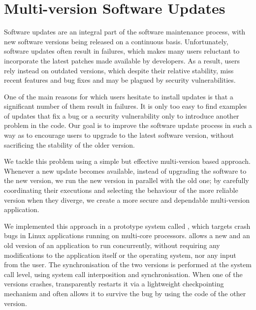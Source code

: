 \chapter{Multi-version Software Updates}
\label{chap:safe-updates}

Software updates are an integral part of the software maintenance
process, with new software versions being released on a continuous
basis.  Unfortunately, software updates often result in failures,
which makes many users reluctant to incorporate the latest patches
made available by developers.  As a result, users rely instead on
outdated versions, which despite their relative stability, miss recent
features and bug fixes and may be plagued by security vulnerabilities.

One of the main reasons for which users hesitate to install updates is
that a significant number of them result in failures.  It is only too
easy to find examples of updates that fix a bug or a security
vulnerability only to introduce another problem in 
the code. Our goal is to improve the software update
process in such a way as to encourage users to upgrade to the latest
software version, without sacrificing the stability of the older
version.

We tackle this problem using a simple but effective multi-version
based approach.  Whenever a new update becomes available, instead of
upgrading the software to the new version, we run the new version in
parallel with the old one; by carefully coordinating their executions
and selecting the behaviour of the more reliable version when they
diverge, we create a more secure and dependable multi-version
application.

We implemented this approach in a prototype system called \mx, which
targets crash bugs in Linux applications running on multi-core
processors. \mx allows a new and an old version of an application to
run concurrently, without requiring any
modifications to the application itself or the operating system, nor any
input from the user.
%
%
The synchronisation of the two versions is performed at the system
call level, using system call interposition and synchronisation.  When
one of the versions crashes, \mx transparently restarts it via a
lightweight checkpointing mechanism and often allows it to survive the bug
by using the code of the other version.

